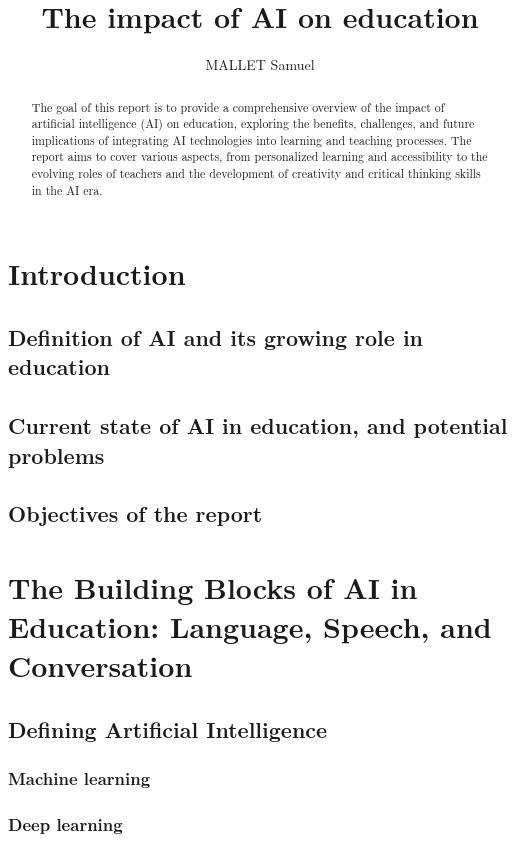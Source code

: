 \documentclass{article}
\title{The impact of AI on education}
\author{MALLET Samuel}
\begin{document}
\maketitle

\begin{abstract}
    The goal of this report is to provide a comprehensive
    overview of the impact of artificial intelligence (AI)
    on education, exploring the benefits, challenges, and
    future implications of integrating AI technologies into
    learning and teaching processes. The report aims to cover
    various aspects, from personalized learning and
    accessibility to the evolving roles of teachers and the
    development of creativity and critical thinking skills
    in the AI era.
\end{abstract}

\newpage

\tableofcontents

\section{Introduction}
\subsection{Definition of AI and its growing role in education}
\subsection{Current state of AI in education, and potential problems}
\subsection{Objectives of the report}
\section{The Building Blocks of AI in Education: Language, Speech, and Conversation}
\subsection{Defining Artificial Intelligence}
\subsubsection{Machine learning}
\subsubsection{Deep learning}
\end{document}
